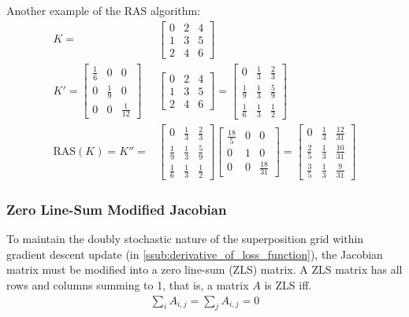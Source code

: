 Another example of the RAS algorithm:
\begin{align*}
    K=&\begin{bmatrix}
        0&2&4\\
        1&3&5\\
        2&4&6
    \end{bmatrix}\\
    K'=
    \begin{bmatrix}
        \frac{1}{6}&0&0\\
        0&\frac{1}{9} &0\\
        0&0&\frac{1}{12}
    \end{bmatrix}
     &\begin{bmatrix}
        0&2&4\\
        1&3&5\\
        2&4&6
    \end{bmatrix}=
    \begin{bmatrix}
        0&\frac{1}{3}&\frac{2}{3}\\[4pt]
        \frac{1}{9}&\frac{1}{3}&\frac{5}{9}\\[4pt]
        \frac{1}{6}&\frac{1}{3}&\frac{1}{2}
    \end{bmatrix}\\
    \text{RAS}(K)=K''=
     &\begin{bmatrix}
         0&\frac{1}{3}&\frac{2}{3}\\[4pt]
         \frac{1}{9}&\frac{1}{3}&\frac{5}{9}\\[4pt]
        \frac{1}{6}&\frac{1}{3}&\frac{1}{2}
    \end{bmatrix}
    \begin{bmatrix}
         \frac{18}{5}&0&0\\
         0&1&0\\
         0&0&\frac{18}{31}
    \end{bmatrix}=
    \begin{bmatrix}
        0&\frac{1}{3}&\frac{12}{31}\\[4pt]
        \frac{2}{5}&\frac{1}{3}&\frac{10}{31}\\[4pt]
        \frac{3}{5}&\frac{1}{3}&\frac{9}{31}
    \end{bmatrix}
\end{align*}

\subsubsection{Zero Line-Sum Modified Jacobian}%
\label{ssub:zero_line_sum_modified_jacobian}
To maintain the doubly stochastic nature of the superposition grid within gradient descent update (in \ref{ssub:derivative_of_loss_function}), the Jacobian matrix must be modified into a zero line-sum (ZLS) matrix.\cite{zeroLineSum} A ZLS matrix has all rows and columns summing to 1, that is, a matrix $A$ is ZLS iff.
\begin{align*}
    \sum_i A_{i,j}=\sum_j A_{i,j}=0
\end{align*}

